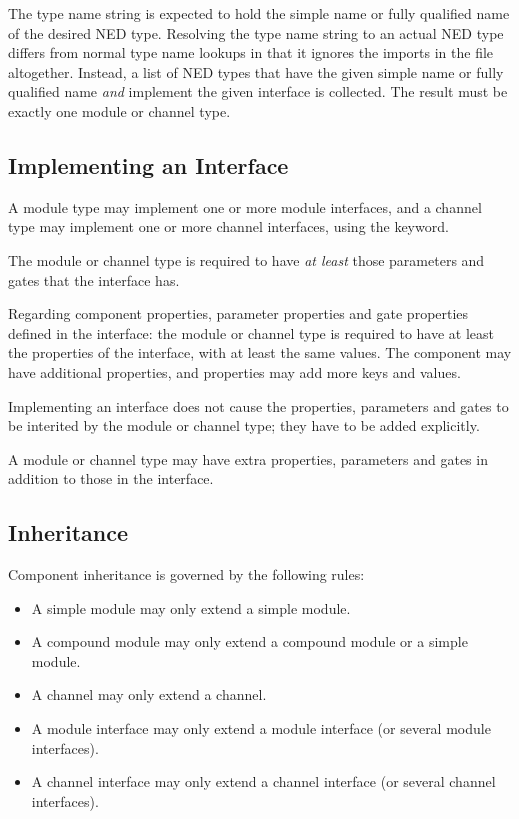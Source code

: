  The type name string is expected to hold the simple name or
fully qualified name of the desired NED type. Resolving the type name
string to an actual NED type differs from normal type name lookups in that
it ignores the imports in the file altogether. Instead, a list of NED types
that have the given simple name or fully qualified name \textit{and}
implement the given interface is collected. The result must be exactly one
module or channel type.


\subsection{Implementing an Interface}
\label{sec:ned-ref:implementing-an-interface}

A module type may implement one or more module interfaces, and a channel type
may implement one or more channel interfaces, using the 
keyword.

The module or channel type is required to have \textit{at least} those
parameters and gates that the interface has.

Regarding component properties, parameter properties and gate properties
defined in the interface: the module or channel type is required to have at
least the properties of the interface, with at least the same values.
The component may have additional properties, and properties may add more
keys and values.

\begin{note}
  Implementing an interface does not cause the properties, parameters and
  gates to be interited by the module or channel type; they have to be added
  explicitly.
\end{note}

\begin{note}
  A module or channel type may have extra properties, parameters and gates
  in addition to those in the interface.
\end{note}



\subsection{Inheritance}
\label{sec:ned-ref:inheritance}

Component inheritance is governed by the following rules:

\begin{itemize}
  \item A simple module may only extend a simple module.
  \item A compound module may only extend a compound module or a simple module.
  \item A channel may only extend a channel.
  \item A module interface may only extend a module interface (or several module
        interfaces).
  \item A channel interface may only extend a channel interface (or several
        channel interfaces).
\end{itemize}

